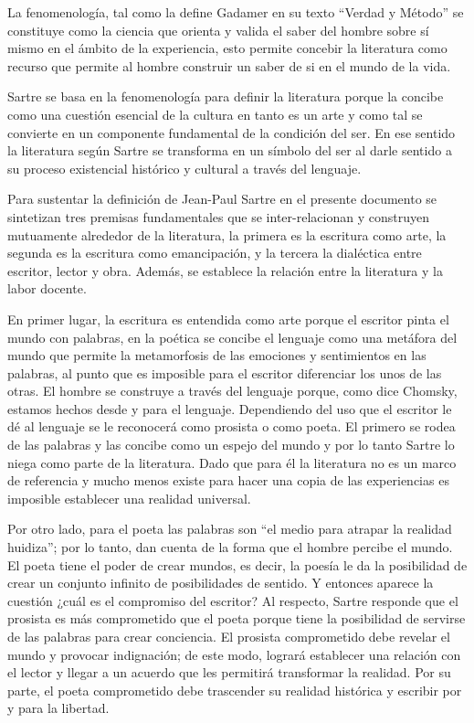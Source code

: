 \begin{enumerate}
 La fenomenología, tal como la define Gadamer en su texto “Verdad y Método” se constituye como la ciencia que orienta  y valida el saber del hombre sobre sí mismo en el ámbito de la experiencia, esto permite concebir la literatura como  recurso que permite al hombre construir un saber de si en el mundo de la vida. 
 
 
Sartre se basa en la fenomenología para definir la literatura porque la concibe como una cuestión esencial de la cultura en tanto es un arte y como tal se convierte en un componente fundamental de la condición del ser. En ese sentido la literatura según Sartre se transforma en un símbolo del ser al darle sentido a su proceso existencial histórico y cultural a través del lenguaje.


 Para sustentar la definición de Jean-Paul Sartre en el presente documento se sintetizan tres premisas fundamentales que se inter-relacionan y construyen mutuamente alrededor de la literatura, la primera es la escritura como arte, la segunda es la escritura como emancipación, y la tercera la dialéctica entre escritor, lector y obra. Además, se establece la relación entre la literatura y la labor docente.
 
 
En primer lugar, la escritura es entendida como arte porque el escritor pinta el mundo con palabras, en la poética se concibe el lenguaje como una metáfora del mundo que permite la metamorfosis de las emociones y sentimientos en las palabras, al punto que es imposible para el escritor diferenciar los unos de las otras. El hombre se construye a través del lenguaje porque, como dice Chomsky, estamos hechos desde y para el lenguaje. Dependiendo del uso que el escritor le dé al lenguaje se le reconocerá como prosista o como poeta. El primero se rodea de las palabras y las concibe como un espejo del mundo y por lo tanto Sartre lo niega como parte de la literatura. Dado que para él la literatura no es un marco de referencia y mucho menos existe para hacer una copia de las experiencias es imposible establecer una realidad universal.


Por otro lado, para el poeta las palabras son ``el medio para atrapar la realidad huidiza''; por lo tanto, dan cuenta de la forma que el hombre percibe el mundo. El poeta tiene el poder de crear mundos, es decir, la poesía le da la posibilidad de crear un conjunto infinito de posibilidades de sentido. Y entonces aparece la cuestión ¿cuál es el compromiso del escritor?  Al respecto, Sartre responde que el prosista es más comprometido que el poeta porque tiene la posibilidad de servirse de las palabras para crear conciencia. El prosista comprometido debe revelar el mundo y provocar indignación; de este modo, logrará establecer una relación con el lector y llegar a un acuerdo que les permitirá transformar la realidad. Por su parte, el poeta comprometido debe trascender su realidad histórica y escribir por y para la libertad.



\end{enumerate}
